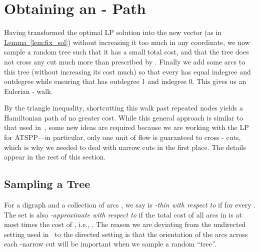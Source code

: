 \documentclass[11pt]{article}
\newcommand{\lref}[2][]{\hyperref[#2]{#1~\ref*{#2}}}
\theoremstyle{definition}
\begin{document}
\section{Obtaining an - Path}
\label{sec:patching}


Having transformed the optimal LP solution  into the new vector 
(as in \lref[Lemma]{lem:fix_sol}) without increasing it too much in any
coordinate, we now sample a random tree such that it has a small total
cost, and that the tree does not cross any cut much more than prescribed
by . Finally we add some arcs to this tree (without increasing its
cost much) so that every  has equal indegree and outdegree
while ensuring that  has outdegree 1 and indegree 0.
This gives us an Eulerian - walk.

By the triangle inequality,
shortcutting this walk past repeated nodes yields a Hamiltonian  path
of no greater cost. While this general approach is similar
to that used in~\cite{AGMSS}, some new ideas are required because we are
working with the LP for ATSPP---in particular, only one unit of flow is
guaranteed to cross - cuts, which is why we needed to deal with
narrow cuts in the first place. The details appear in the rest of this section.

\subsection{Sampling a Tree}\label{sec:sample}

For a digraph  and a collection of arcs , we say  is
\emph{-thin with respect to } if  for every . The set  is also
\emph{-approximate with respect to } if the total cost of
all arcs in  is at most  times the cost of , i.e.,
.  The reason
we are deviating from the undirected setting used in~\cite{AGMSS} to the directed setting is that the
orientation of the arcs across each -narrow cut will be important
when we sample a random ``tree''.
\end{document}
